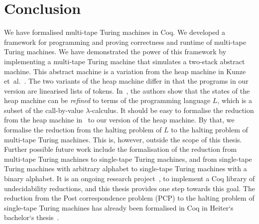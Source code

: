 \chapter{Conclusion}
\label{chap:conclusion}

We have formalised multi-tape Turing machines in Coq.  We developed a framework for programming and proving correctness and runtime of multi-tape
Turing machines.  We have demonstrated the power of this framework by implementing a multi-tape Turing machine that simulates a two-stack abstract
machine.  This abstract machine is a variation from the heap machine in Kunze et~al.~\cite{KunzeEtAl:2018:Formal}.  The two variants of the heap
machine differ in that the programs in our version are linearised lists of tokens.  In~\cite{KunzeEtAl:2018:Formal}, the authors show that the states
of the heap machine can be \textit{refined} to terms of the programming language $L$, which is a subset of the call-by-value
$\lambda$-calculus.  It should be easy to formalise the reduction from the heap machine in~\cite{KunzeEtAl:2018:Formal} to our version of
the heap machine.  By that, we formalise the reduction from the halting problem of $L$ to the halting problem of multi-tape Turing machines.  This is,
however, outside the scope of this thesis.  Further possible future work include the formalisation of the reduction from multi-tape Turing machines to
single-tape Turing machines, and from single-tape Turing machines with arbitrary alphabet to single-tape Turing machines with a binary alphabet.  It
is an ongoing research project~\cite{ForsterLOLA}, to implement a Coq library of undecidability reductions, and this thesis provides one step towards
this goal.  The reduction from the Post correspondence problem (PCP) to the halting problem of single-tape Turing machines has already been formalised
in Coq in Heiter`s bachelor`s thesis~\cite{Heiter}.


